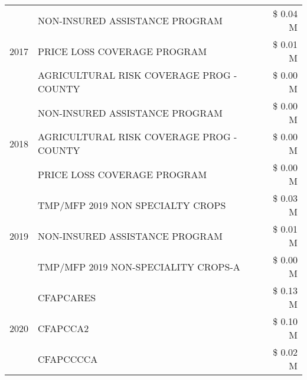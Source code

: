 \begin{tabular}{llr}
\cline{1-3}
\multirow[t]{3}{*}{2017} & NON-INSURED ASSISTANCE PROGRAM & \$ 0.04 M \\
 & PRICE LOSS COVERAGE PROGRAM & \$ 0.01 M \\
 & AGRICULTURAL RISK COVERAGE PROG - COUNTY & \$ 0.00 M \\
\cline{1-3}
\multirow[t]{3}{*}{2018} & NON-INSURED ASSISTANCE PROGRAM & \$ 0.00 M \\
 & AGRICULTURAL RISK COVERAGE PROG - COUNTY & \$ 0.00 M \\
 & PRICE LOSS COVERAGE PROGRAM & \$ 0.00 M \\
\cline{1-3}
\multirow[t]{3}{*}{2019} & TMP/MFP 2019 NON SPECIALTY CROPS & \$ 0.03 M \\
 & NON-INSURED ASSISTANCE PROGRAM & \$ 0.01 M \\
 & TMP/MFP 2019 NON-SPECIALITY CROPS-A & \$ 0.00 M \\
\cline{1-3}
\multirow[t]{3}{*}{2020} & CFAPCARES & \$ 0.13 M \\
 & CFAPCCA2 & \$ 0.10 M \\
 & CFAPCCCCA & \$ 0.02 M \\
\cline{1-3}
\bottomrule
\end{tabular}
